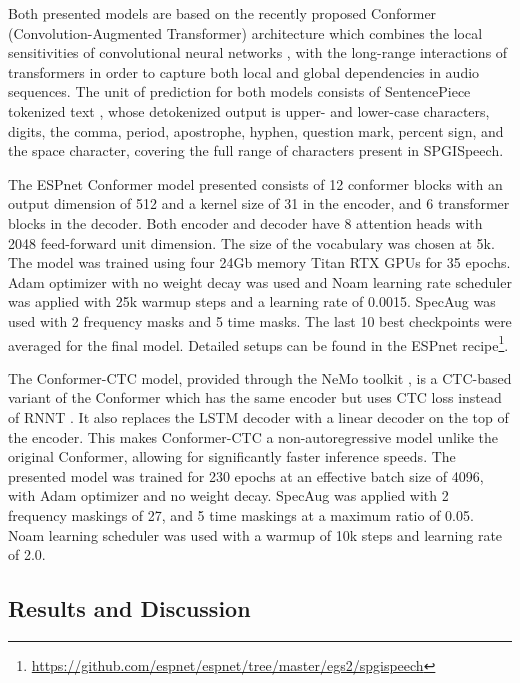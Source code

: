 \documentclass{article}
\newcommand{\corpus}{SPGISpeech}
\begin{document}
Both presented models are based on the recently proposed Conformer (Convolution-Augmented Transformer) architecture \cite{gulati2020conformer} which combines the local sensitivities of convolutional neural networks \cite{fukushima80, abdelhamid14}, with the long-range interactions of transformers \cite{vaswani17} in order to capture both local and global dependencies in audio sequences. The unit of prediction for both models consists of SentencePiece tokenized text \cite{richardson18}, whose detokenized output is upper- and lower-case characters, digits, the comma, period, apostrophe, hyphen, question mark, percent sign, and the space character, covering the full range of characters present in \corpus{}.

The ESPnet Conformer model presented consists of 12 conformer blocks with an output dimension of 512 and a kernel size of 31 in the encoder, and 6 transformer blocks in the decoder.
Both encoder and decoder have 8 attention heads with 2048 feed-forward unit dimension. The size of the vocabulary was chosen at 5k. The model was trained using four 24Gb memory Titan RTX GPUs for 35 epochs. Adam optimizer with no weight decay was used and Noam learning rate scheduler was applied with 25k warmup steps and a learning rate of 0.0015. SpecAug was used with 2 frequency masks and 5 time masks. The last 10 best checkpoints were averaged for the final model. Detailed setups can be found in the ESPnet recipe\footnote{\url{https://github.com/espnet/espnet/tree/master/egs2/spgispeech}\label{foot:espnet}}.

The Conformer-CTC model, provided through the NeMo toolkit \cite{kuchaiev19}, is a CTC-based variant of the Conformer which has the same encoder but uses CTC loss \cite{graves06} instead of RNNT \cite{graves12}. It also replaces the LSTM decoder with a linear decoder on the top of the encoder. This makes
Conformer-CTC a non-autoregressive model unlike the original
Conformer, allowing for significantly faster inference speeds. The presented model was trained for 230 epochs at an effective batch size of 4096, with Adam optimizer and no weight decay. SpecAug was applied with 2 frequency maskings of 27, and 5 time maskings at a maximum ratio of 0.05. Noam learning scheduler was used with a warmup of 10k steps and learning rate of 2.0.

\subsection{Results and Discussion}
\end{document}
